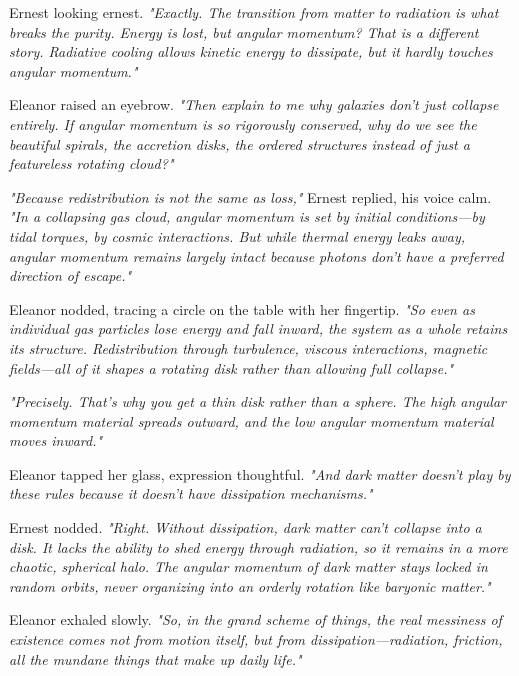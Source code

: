 \smallskip

Ernest looking ernest. \textit{"Exactly. The transition from matter to radiation is what breaks the purity. Energy is lost, but angular momentum? That is a different story. Radiative cooling allows kinetic energy to dissipate, but it hardly touches angular momentum."}

\smallskip

Eleanor raised an eyebrow. \textit{"Then explain to me why galaxies don’t just collapse entirely. If angular momentum is so rigorously conserved, why do we see the beautiful spirals, the accretion disks, the ordered structures instead of just a featureless rotating cloud?"}

\smallskip

\textit{"Because redistribution is not the same as loss,"} Ernest replied, his voice calm. \textit{"In a collapsing gas cloud, angular momentum is set by initial conditions—by tidal torques, by cosmic interactions. But while thermal energy leaks away, angular momentum remains largely intact because photons don’t have a preferred direction of escape."}

\smallskip

Eleanor nodded, tracing a circle on the table with her fingertip. \textit{"So even as individual gas particles lose energy and fall inward, the system as a whole retains its structure. Redistribution through turbulence, viscous interactions, magnetic fields—all of it shapes a rotating disk rather than allowing full collapse."}

\smallskip

\textit{"Precisely. That’s why you get a thin disk rather than a sphere. The high angular momentum material spreads outward, and the low angular momentum material moves inward."}

\smallskip

Eleanor tapped her glass, expression thoughtful. \textit{"And dark matter doesn’t play by these rules because it doesn’t have dissipation mechanisms."}

\bigskip

Ernest nodded. \textit{"Right. Without dissipation, dark matter can’t collapse into a disk. It lacks the ability to shed energy through radiation, so it remains in a more chaotic, spherical halo. The angular momentum of dark matter stays locked in random orbits, never organizing into an orderly rotation like baryonic matter."}

\bigskip

Eleanor exhaled slowly. \textit{"So, in the grand scheme of things, the real messiness of existence comes not from motion itself, but from dissipation—radiation, friction, all the mundane things that make up daily life."}

